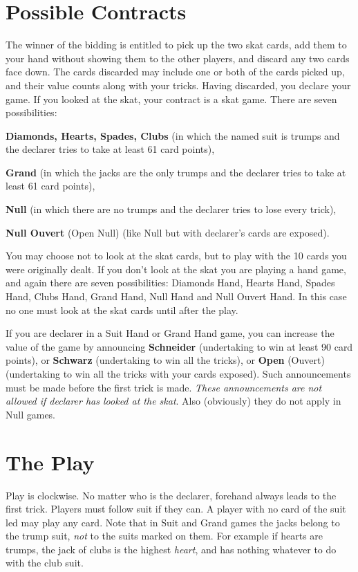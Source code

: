 \documentclass[letter]{article}
\begin{document}
  \section*{Possible Contracts}

  The winner of the bidding is entitled to pick up the two skat cards, add them
  to your hand without showing them to the other players, and discard any two
  cards face down. The cards discarded may include one or both of the cards
  picked up, and their value counts along with your tricks. Having discarded,
  you declare your game. If you looked at the skat, your contract is a skat
  game. There are seven possibilities:

  {\bfseries Diamonds, Hearts, Spades, Clubs} (in which the named suit is trumps and the
   declarer tries to take at least 61 card points),

  {\bfseries Grand} (in which the jacks are the only trumps and the declarer tries to take
   at least 61 card points),

  {\bfseries Null} (in which there are no trumps and the declarer tries to lose every
   trick),

  {\bfseries Null Ouvert} (Open Null) (like Null but with declarer's cards are exposed).

  You may choose not to look at the skat cards, but to play with the 10 cards
  you were originally dealt. If you don't look at the skat you are playing a
  hand game, and again there are seven possibilities: Diamonds Hand, Hearts
  Hand, Spades Hand, Clubs Hand, Grand Hand, Null Hand and Null Ouvert Hand.
  In this case no one must look at the skat cards until after the play.

  If you are declarer in a Suit Hand or Grand Hand game, you can increase the
  value of the game by announcing {\bfseries Schneider} (undertaking to win at
  least 90 card points), or {\bfseries Schwarz} (undertaking to win all the
  tricks), or {\bfseries Open} (Ouvert) (undertaking to win all the tricks with
  your cards exposed). Such announcements must be made before the first trick is
  made. \emph{These announcements are not allowed if declarer has looked at the
  skat}. Also (obviously) they do not apply in Null games.

  \section*{The Play}

  Play is clockwise. No matter who is the declarer, forehand always leads to the
  first trick. Players must follow suit if they can. A player with no card of
  the suit led may play any card. Note that in Suit and Grand games the jacks
  belong to the trump suit, \emph{not} to the suits marked on them. For example
  if hearts are trumps, the jack of clubs is the highest \emph{heart}, and has
  nothing whatever to do with the club suit.
\end{document}
